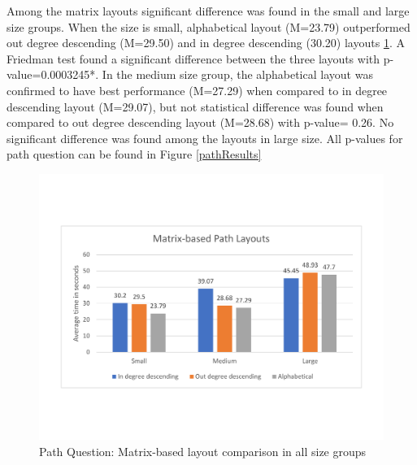 \documentclass{l4proj}
\begin{document}
Among the matrix layouts significant difference was found in the small and large size groups. When the size is small, alphabetical layout (M=23.79) outperformed out degree descending (M=29.50) and in degree descending (30.20) layouts \ref{matrixpathlayouts}. A Friedman test found a significant difference between the three layouts with p-value=0.0003245*. In the medium size group, the alphabetical layout was confirmed to have best performance (M=27.29) when compared to in degree descending layout (M=29.07), but not statistical difference was found when compared to out degree descending layout (M=28.68) with p-value= 0.26. No significant difference was found among the layouts in large size. All p-values for path question can be found in Figure \ref{pathResults} 


\begin{figure}[H]
\centering
\includegraphics[width=15cm]{matrixpathlayouts.pdf}
\caption{Path Question: Matrix-based layout comparison in all size groups}
\label{matrixpathlayouts}
\end{figure}
\end{document}
